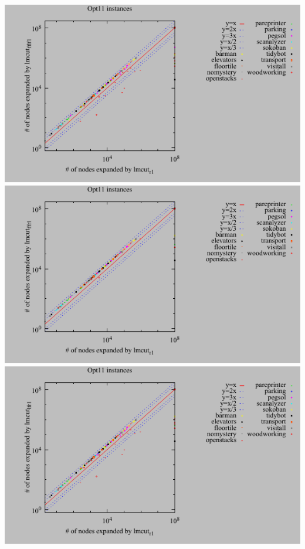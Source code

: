 \includegraphics{tables/opt11-expanded-lmcut_r-lmcut_fflf.pdf}
\linebreak
\includegraphics{tables/opt11-expanded-lmcut_r-lmcut_ffr.pdf}
\linebreak
\includegraphics{tables/opt11-expanded-lmcut_r-lmcut_lfr.pdf}
\linebreak
